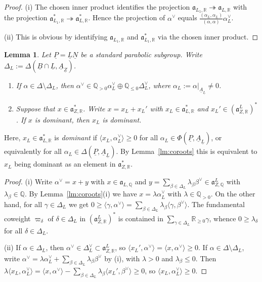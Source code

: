 \documentclass[a4paper]{amsart}
\numberwithin{equation}{section}
\newtheorem{lem}[thm]{Lemma}
\theoremstyle{remark}
\theoremstyle{definition}
\newcommand{\Q}{\mathbb{Q}}
\newcommand{\R}{\mathbb{R}}
\newcommand{\alggrp}[1]{\underline{#1}}
\newcommand{\ang}[1]{\langle #1\rangle}
\begin{document}
\begin{proof}
  (i) The chosen inner product identifies the projection $\mathfrak{a}_{L_{1},\R} \twoheadrightarrow \mathfrak{a}_{L,\R}$ with the projection $\mathfrak{a}_{L_{1},\R}^* \twoheadrightarrow \mathfrak{a}_{L,\R}^*$.
  Hence the projection of $\alpha^\vee$ equals $\frac{(\alpha_{L},\alpha_{L})}{(\alpha,\alpha)}\alpha_{L}^\vee$.

  (ii) This is obvious by identifying $\mathfrak{a}_{L_{1},\R}$ and $\mathfrak{a}_{L_{1},\R}^*$ via the chosen inner product.
\end{proof}

\begin{lem}\label{lem:dominant-proj}
  Let $\alggrp{P} = \alggrp{L}\alggrp{N}$ be a standard parabolic subgroup.
  Write $\Delta_L := \Delta(\alggrp B \cap \alggrp L,\alggrp A_{\alggrp Z})$.
  \begin{enumerate}
  \item 
    If $\alpha\in \Delta\setminus\Delta_{L}$, then $\alpha^{\vee}\in \Q_{>0}\alpha_L^\vee \oplus \Q_{\le 0}\Delta_{L}^{\vee}$, where $\alpha_L := \alpha|_{\alggrp A_{\alggrp L}} \ne 0$.
  \item 
    Suppose that $x \in \mathfrak{a}_{Z,\R}^*$. 
    Write $x = x_L + x_L'$ with $x_L \in \mathfrak{a}_{L,\R}^*$ and $x_L' \in (\mathfrak{a}^L_{Z,\R})^*$.
    If $x$ is dominant, then $x_L$ is dominant.
  \end{enumerate}
\end{lem}

Here, $x_L \in \mathfrak{a}_{L,\R}^*$ is \emph{dominant} if $\ang{x_L,\alpha_L^\vee} \ge 0$ for all $\alpha_L \in \Phi(\alggrp P,\alggrp{A}_{\alggrp{L}})$, or equivalently for all $\alpha_L \in \Delta(\alggrp P,\alggrp{A}_{\alggrp{L}})$.
By Lemma~\ref{lm:coroots} this is equivalent to $x_{L}$ being dominant as an element in $\mathfrak{a}_{Z,\R}^{*}$. 

\begin{proof}
  (i) Write $\alpha^\vee = x+y$ with $x\in \mathfrak{a}_{L,\Q}$ and $y = \sum_{\beta \in \Delta_L} \lambda_\beta \beta^\vee \in \mathfrak{a}_{Z,\Q}^{L}$ with $\lambda_\beta \in \Q$.
  By Lemma~\ref{lm:coroots}(i) we have $x = \lambda \alpha_L^\vee$ with $\lambda \in \Q_{>0}$.
  On the other hand, for all $\gamma \in \Delta_L$ we get $0 \ge \ang{\gamma,\alpha^\vee} = \sum_{\beta \in \Delta_L} \lambda_\beta \ang{\gamma,\beta^\vee}$.
  The fundamental coweight $\varpi_\delta$ of $\delta \in \Delta_L$ in $(\mathfrak{a}_{Z,\R}^{L})^*$ is contained in $\sum_{\gamma \in \Delta_L} \R_{\ge 0} \gamma$, whence $0 \ge \lambda_\delta$ for all $\delta \in \Delta_L$.

  (ii) If $\alpha \in \Delta_L$, then $\alpha^\vee \in \Delta_L^\vee \subset \mathfrak{a}^L_{Z,\R}$, so $\ang{x_L',\alpha^\vee} = \ang{x,\alpha^\vee} \ge 0$.
  If $\alpha \in \Delta\setminus \Delta_L$, write $\alpha^\vee = \lambda \alpha_L^\vee + \sum_{\beta \in \Delta_L} \lambda_\beta \beta^\vee$ by (i), with $\lambda > 0$ and $\lambda_\beta \le 0$.
  Then $\lambda\ang{x_L,\alpha_L^\vee} = \ang{x,\alpha^\vee} - \sum_{\beta \in \Delta_L} \lambda_\beta \ang{x_L',\beta^\vee} \ge 0$, so $\ang{x_L,\alpha_L^\vee} \ge 0$.
\end{proof}
\end{document}
